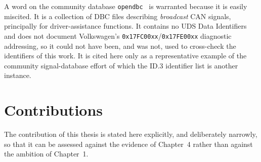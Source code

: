 \documentclass[11pt,a4paper,oneside,parskip=half]{scrreprt}
\providecommand{\hex}{}\renewcommand{\hex}[1]{\texttt{0x#1}}
\begin{document}
A word on the community database \texttt{opendbc}~\cite{opendbc} is warranted because it is easily miscited. It is a collection of DBC files describing \emph{broadcast} CAN signals, principally for driver-assistance functions. It contains no UDS Data Identifiers and does not document Volkswagen's \hex{17FC00xx}/\hex{17FE00xx} diagnostic addressing, so it could not have been, and was not, used to cross-check the identifiers of this work. It is cited here only as a representative example of the community signal-database effort of which the ID.3 identifier list is another instance.

\section{Contributions}
The contribution of this thesis is stated here explicitly, and deliberately narrowly, so that it can be assessed against the evidence of Chapter~4 rather than against the ambition of Chapter~1.
\end{document}
